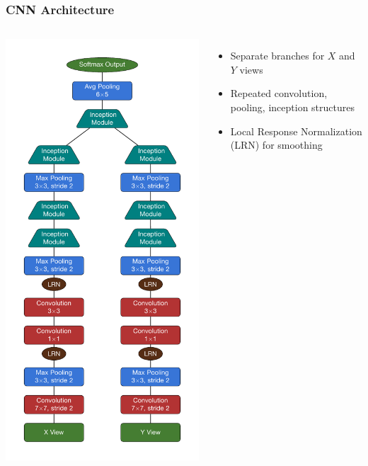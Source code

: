 \documentclass[10pt,professionalfonts,xcolor=table]{beamer}
\begin{document}
\begin{frame}

\frametitle{\nova CNN Architecture}

  \begin{columns}
   \includegraphics[height=0.95\textheight]{figures/arch/arch.pdf}
  \begin{itemize}
  \item Separate branches for $X$ and $Y$ views
  \gap
  \item Repeated convolution, pooling, inception structures
  \gap
  \item Local Response Normalization (LRN) for smoothing
  \end{itemize}
  \end{columns}
\end{frame}
\end{document}
